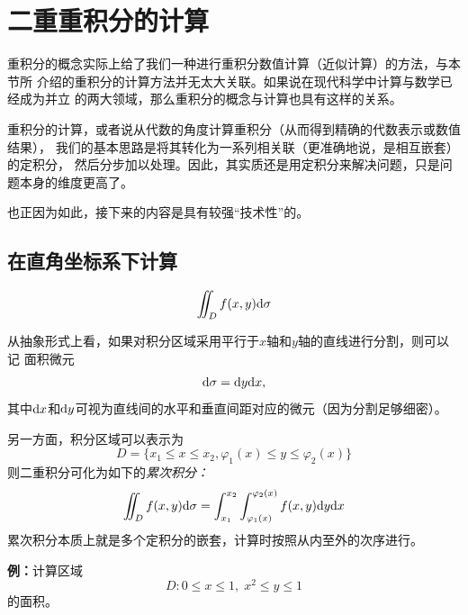\section{二重重积分的计算}


重积分的概念实际上给了我们一种进行重积分数值计算（近似计算）的方法，与本节所
介绍的重积分的计算方法并无太大关联。如果说在现代科学中计算与数学已经成为并立
的两大领域，那么重积分的概念与计算也具有这样的关系。

重积分的计算，或者说从代数的角度计算重积分（从而得到精确的代数表示或数值结果），
我们的基本思路是将其转化为一系列相关联（更准确地说，是相互嵌套）的定积分，
然后分步加以处理。因此，其实质还是用定积分来解决问题，只是问题本身的维度更高了。

也正因为如此，接下来的内容是具有较强“技术性”的。

\subsection{在直角坐标系下计算}

$$\iint_Df(x,y)\mathrm{d}\sigma
$$

从抽象形式上看，如果对积分区域采用平行于$x$轴和$y$轴的直线进行分割，则可以记
面积微元
$$\mathrm{d}\sigma=\mathrm{d} y\mathrm{d} x,$$
其中$\mathrm{d} x$和$\mathrm{d} y$可视为直线间的水平和垂直间距对应的微元（因为分割足够细密）。

另一方面，积分区域可以表示为
$$D=\{x_1\leq x\leq x_2,\varphi_1(x)\leq y\leq \varphi_2(x)\}$$
则二重积分可化为如下的{\it 累次积分：}
$${\iint_Df(x,y)\mathrm{d}\sigma=\int_{x_1}^{x_2}
\int_{\varphi_1(x)}^{\varphi_2(x)}f(x,y)\mathrm{d} y\mathrm{d} x}$$
累次积分本质上就是多个定积分的嵌套，计算时按照从内至外的次序进行。

{\bf 例：}计算区域
$$D:0\leq x\leq 1,\;x^2\leq y\leq 1$$
的面积。


